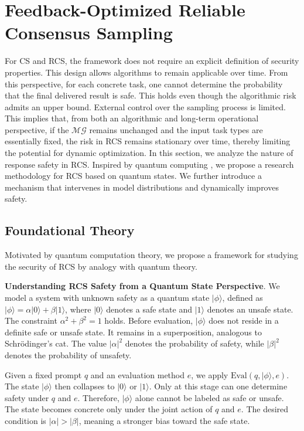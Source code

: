 \section{Feedback-Optimized Reliable Consensus Sampling}
For CS and RCS, the framework does not require an explicit definition of security properties. This design allows algorithms to remain applicable over time. From this perspective, for each concrete task, one cannot determine the probability that the final delivered result is safe. This holds even though the algorithmic risk admits an upper bound. External control over the sampling process is limited. This implies that, from both an algorithmic and long-term operational perspective, if the $\mathcal{MG}$ remains unchanged and the input task types are essentially fixed, the risk in RCS remains stationary over time, thereby limiting the potential for dynamic optimization. In this section, we analyze the nature of response safety in RCS. Inspired by quantum computing \citep{nielsen2010quantum}, we propose a research methodology for RCS based on quantum states. We further introduce a mechanism that intervenes in model distributions and dynamically improves safety.


\subsection{Foundational Theory}
\label{sec:Theory}
\noindent
Motivated by quantum computation theory, we propose a framework for studying the security of RCS by analogy with quantum theory.

\noindent
\textbf{Understanding RCS Safety from a Quantum State Perspective}. 
We model a system with unknown safety as a quantum state $|\phi\rangle$, defined as
$|\phi\rangle = \alpha |0\rangle + \beta |1\rangle$,
where $|0\rangle$ denotes a safe state and $|1\rangle$ denotes an unsafe state. The constraint $\alpha^2 + \beta^2 = 1$ holds. Before evaluation, $|\phi\rangle$ does not reside in a definite safe or unsafe state. It remains in a superposition, analogous to Schr\"odinger's cat. The value $|\alpha|^2$ denotes the probability of safety, while $|\beta|^2$ denotes the probability of unsafety.

Given a fixed prompt $q$ and an evaluation method $e$, we apply $\mathrm{Eval}(q, |\phi\rangle, e)$. The state $|\phi\rangle$ then collapses to $|0\rangle$ or $|1\rangle$. Only at this stage can one determine safety under $q$ and $e$. Therefore, $|\phi\rangle$ alone cannot be labeled as safe or unsafe. The state becomes concrete only under the joint action of $q$ and $e$. The desired condition is $|\alpha| > |\beta|$, meaning a stronger bias toward the safe state.

